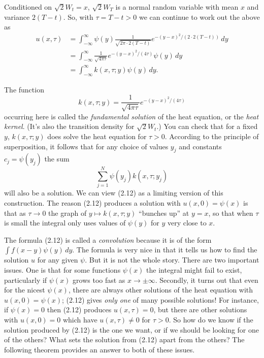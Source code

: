 Conditioned on \(\sqrt{2} W_t = x\), \(\sqrt{2} W_T\) is a normal random variable with mean \(x\) and variance \(2(T-t)\). So, with \(\tau = T - t > 0\) we can continue to work out the above as
\begin{align*}
u(x,\tau) &= \int_{-\infty}^{\infty} \psi(y) \frac{1}{\sqrt{2\pi \cdot 2(T-t)}} e^{-(y-x)^2 / (2 \cdot 2(T-t))} \, dy \\
&= \int_{-\infty}^{\infty} \frac{1}{\sqrt{4\pi \tau}} e^{-(y-x)^2 / (4\tau)} \psi(y) \, dy \\
&= \int_{-\infty}^{\infty} k(x,\tau; y) \psi(y) \, dy. \tag{2.12}
\end{align*}

The function
\[
k(x,\tau; y) = \frac{1}{\sqrt{4\pi \tau}} e^{-(y-x)^2 / (4\tau)}
\]
occurring here is called the \textit{fundamental solution} of the heat equation, or the \textit{heat kernel}. (It's also the transition density for \(\sqrt{2} W_t\).) You can check that for a fixed \(y\), \(k(x,\tau; y)\) does solve the heat equation for \(\tau > 0\). According to the principle of superposition, it follows that for any choice of values \(y_j\) and constants \(c_j = \psi(y_j)\) the sum
\[
\sum_{j=1}^{N} \psi(y_j) k(x,\tau; y_j)
\]
will also be a solution. We can view (2.12) as a limiting version of this construction. The reason (2.12) produces a solution with \(u(x,0) = \psi(x)\) is that as \(\tau \to 0\) the graph of \(y \mapsto k(x,\tau; y)\) ``bunches up'' at \(y = x\), so that when \(\tau\) is small the integral only uses values of \(\psi(y)\) for \(y\) very close to \(x\).

The formula (2.12) is called a \textit{convolution} because it is of the form \(\int f(x-y) \psi(y) \, dy\). The formula is very nice in that it tells us how to find the solution \(u\) for any given \(\psi\). But it is not the whole story. There are two important issues. One is that for some functions \(\psi(x)\) the integral might fail to exist, particularly if \(\psi(x)\) grows too fast as \(x \to \pm \infty\). Secondly, it turns out that even for the nicest \(\psi(x)\), there are always other solutions of the heat equation with \(u(x,0) = \psi(x)\); (2.12) gives \textit{only one} of many possible solutions! For instance, if \(\psi(x) = 0\) then (2.12) produces \(u(x,\tau) = 0\), but there are other solutions with \(u(x,0) = 0\) which have \(u(x,\tau) \neq 0\) for \(\tau > 0\). So how do we know if the solution produced by (2.12) is the one we want, or if we should be looking for one of the others? What sets the solution from (2.12) apart from the others? The following theorem provides an answer to both of these issues.

